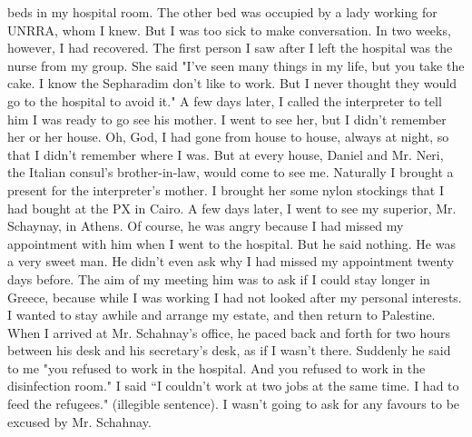 beds in my hospital room. The other bed was occupied by a lady working for UNRRA, whom 
I knew. But I was too sick to make conversation. In two weeks, however, I had recovered. 
The first person I saw after I left the hospital was the nurse from my group. She 
said "I've seen many things in my life, but you take the cake. I know the Sepharadim 
don't like to work. But I never thought they would go to the hospital to avoid it." 
A few days later, I called the interpreter to tell him I was ready to go see his 
mother. I went to see her, but I didn't remember her or her house. Oh, God, I had gone 
from house to house, always at night, so that I didn't remember where I was. But at 
every house, Daniel and Mr. Neri, the Italian consul's brother-in-law, would come to see 
me. Naturally I brought a present for the interpreter's mother. I brought her some 
nylon stockings that I had bought at the PX in Cairo. 
A few days later, I went to see my superior, Mr. Schaynay, in Athens. Of course, 
he was angry because I had missed my appointment with him when I went to the hospital. 
But he said nothing. He was a very sweet man. He didn't even ask why I had missed my 
appointment twenty days before. The aim of my meeting him was to ask if I could stay 
longer in Greece, because while I was working I had not looked after my personal interests. 
I wanted to stay awhile and arrange my estate, and then return to Palestine. 
When I arrived at Mr. Schahnay's office, he paced back and forth for two hours 
between his desk and his secretary's desk, as if I wasn't there. Suddenly he said to me 
"you refused to work in the hospital. And you refused to work in the disinfection room." 
I said “I couldn't work at two jobs at the same time. I had to feed the refugees."  (illegible sentence). I wasn’t going to ask for any favours to be excused by Mr. Schahnay. 
